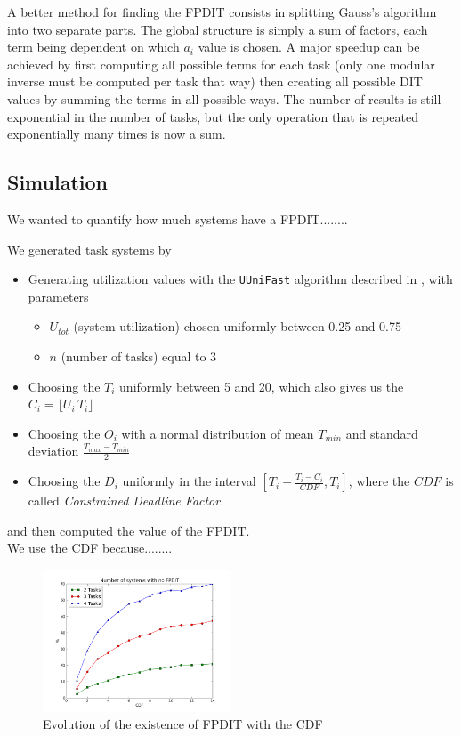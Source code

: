 \documentclass[conference]{IEEEtran}
\begin{document}
    A better method for finding the FPDIT consists in splitting Gauss's algorithm
    into two separate parts. The global structure is simply a sum of factors, each
    term being dependent on which $a_i$ value is chosen. A major speedup can
    be achieved by first computing all possible terms for each task (only one
    modular inverse must be computed per task that way) then creating all possible DIT values
    by summing the terms in all possible ways. The number of results is still
    exponential in the number of tasks, but the only operation that is repeated
    exponentially many times is now a sum.

  \subsection{Simulation}

  We wanted to quantify how much systems have a FPDIT........

  We generated task systems by
  \begin{itemize}
    \item Generating utilization values with the \texttt{UUniFast} algorithm described in \cite{bini2005measuring}, with parameters
    \begin{itemize}
      \item $U_{tot}$ (system utilization) chosen uniformly between 0.25 and 0.75
      \item $n$ (number of tasks) equal to 3
    \end{itemize}
    \item Choosing the $T_i$ uniformly between 5 and 20, which also gives us the $C_i = \lfloor U_i \, T_i \rfloor$
    \item Choosing the $O_i$ with a normal distribution of mean $T_{min}$ and standard deviation $\frac{T_{max} - T_{min}}{2}$
    \item Choosing the $D_i$ uniformly in the interval $[T_i - \frac{T_i - C_i}{CDF}, T_i]$, where the $CDF$ is called \emph{Constrained Deadline Factor}.
  \end{itemize}
  and then computed the value of the FPDIT.\\

  We use the CDF because........\\

  \begin{figure}[h]
  \begin{center}
    \includegraphics[width=0.5\textwidth]{python-simulation/plots/nofpdit.png}
  \end{center}
  \caption{Evolution of the existence of FPDIT with the CDF}
  \label{fig:noFPDIT}
  \end{figure}
\end{document}
